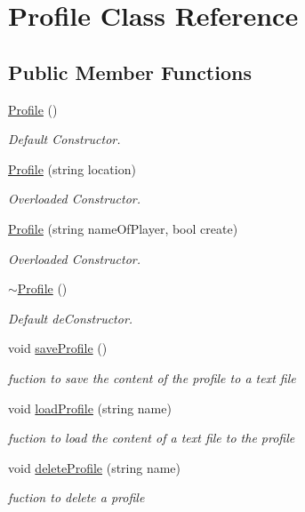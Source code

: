 \hypertarget{class_profile}{}\section{Profile Class Reference}
\label{class_profile}
\subsection*{Public Member Functions}
\begin{DoxyCompactItemize}
\item 
\hyperlink{class_profile_a4eea708cdbed0262d9e7ddbe3f1e3f89}{Profile} ()
\begin{DoxyCompactList}\small\item\em Default Constructor. \end{DoxyCompactList}\item 
\hyperlink{class_profile_a2f1ced1b7bf7fc6d54468f645ba9899c}{Profile} (string location)
\begin{DoxyCompactList}\small\item\em Overloaded Constructor. \end{DoxyCompactList}\item 
\hyperlink{class_profile_a69b3d3c58a1db8e6edeea0c48f40ab4b}{Profile} (string name\+Of\+Player, bool create)
\begin{DoxyCompactList}\small\item\em Overloaded Constructor. \end{DoxyCompactList}\item 
\hyperlink{class_profile_a58fa758a59bc4ee3c1a9980e360e4e98}{$\sim$\+Profile} ()
\begin{DoxyCompactList}\small\item\em Default de\+Constructor. \end{DoxyCompactList}\item 
\hypertarget{class_profile_a21c59434bd6dec62c974b208caf2ff58}{}\label{class_profile_a21c59434bd6dec62c974b208caf2ff58} 
void \hyperlink{class_profile_a21c59434bd6dec62c974b208caf2ff58}{save\+Profile} ()
\begin{DoxyCompactList}\small\item\em fuction to save the content of the profile to a text file \end{DoxyCompactList}\item 
\hypertarget{class_profile_afe06c4b329f11dce5478f17c201a0dff}{}\label{class_profile_afe06c4b329f11dce5478f17c201a0dff} 
void \hyperlink{class_profile_afe06c4b329f11dce5478f17c201a0dff}{load\+Profile} (string name)
\begin{DoxyCompactList}\small\item\em fuction to load the content of a text file to the profile \end{DoxyCompactList}\item 
\hypertarget{class_profile_ac1e3c9978e12cb532f5a9582a735d990}{}\label{class_profile_ac1e3c9978e12cb532f5a9582a735d990} 
void \hyperlink{class_profile_ac1e3c9978e12cb532f5a9582a735d990}{delete\+Profile} (string name)
\begin{DoxyCompactList}\small\item\em fuction to delete a profile \end{DoxyCompactList}\end{DoxyCompactItemize}
